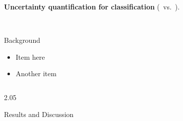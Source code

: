 \documentclass[final,12pt]{beamer}
\newlength{\sepwidth}
\newlength{\colwidth}
\newcommand{\separatorcolumn}{\begin{column}{\sepwidth}\end{column}}
\begin{document}
\begin{frame}[t]
\begin{columns}[t]
\begin{column}{\colwidth}
\begin{minipage}{\textwidth}
\begin{figure}[t]
\begin{tikzpicture}[outer sep=0,inner sep=0]
  \end{tikzpicture}
  \newcommand{\mycircle}{\protect\tikz[baseline=-.6ex]\protect\node[circle,inner sep=2pt,draw=black,fill=C0,opacity=.5]{};}
  \newcommand{\mysquare}{\protect\tikz[baseline=-.6ex]\protect\node[inner sep=2.5pt,draw=black,fill=C1,opacity=.5]{};}
  \newcommand{\myinducing}{\protect\tikz[baseline=-.7ex]\protect\node[circle,inner sep=1.5pt,draw=black,fill=black]{};}
\end{figure}
\alert{\textbf{Uncertainty quantification for classification}}  (\mysquare~vs.~\mycircle). %
\end{minipage}\\[2cm]
  
  \begin{block}{Background}

  \begin{itemize}
     \item Item here
     \item Another item
  \end{itemize}

  \end{block}

\end{column}

\separatorcolumn
\end{columns}

\begin{columns}
	\begin{column}{2.05\colwidth}
		  \begin{block}{Results and Discussion}


\end{block}
\end{column}
\end{columns}
\end{frame}
\end{document}
